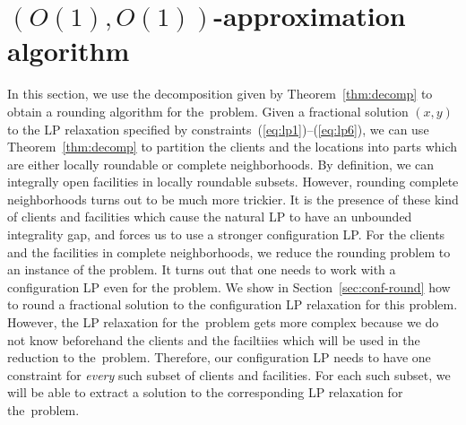 
\section{$(O(1), O(1))$-approximation algorithm}
In this section, we use the decomposition given by Theorem~\ref{thm:decomp} to obtain a rounding algorithm for the~\mckc problem. Given 
a fractional solution $(x,y)$ to the LP relaxation specified by constraints~(\ref{eq:lp1})--(\ref{eq:lp6}), we can use Theorem~\ref{thm:decomp} to partition 
the clients and the locations into parts which are either  locally roundable or complete neighborhoods. By definition, we can integrally open facilities
in locally roundable subsets. However, rounding complete neighborhoods turns out to be much more trickier. It is the presence of these kind of clients
and facilities which cause the natural LP to have an unbounded integrality gap, and forces us to use a stronger configuration LP.  For the clients
and the facilities in complete neighborhoods, we reduce the rounding problem to an instance of the \cckp problem. It turns out that one needs
to work with a configuration LP even for the \cckp problem. We show in Section~\ref{sec:conf-round} how to round a fractional solution to the configuration LP 
relaxation for this problem. However, the LP relaxation for the~\mckc problem gets more complex because we do not know beforehand the 
clients and the faciltiies which will be used in the reduction to the~\cckp problem. Therefore, our configuration LP needs to have one constraint
for {\em every} such subset of clients and facilities. For each such subset, we will be able to extract a solution to the corresponding LP relaxation 
for the~\cckp problem. 


